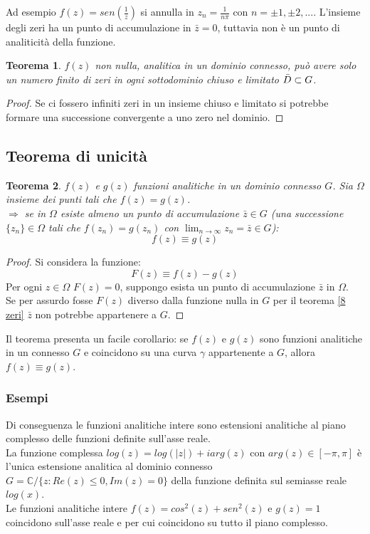 \documentclass[twoside]{article}
\newtheorem{theorem}{Teorema}[section]
\begin{document}
Ad esempio $f(z)=sen\left(\frac{1}{z}\right)$ si annulla in $z_n=\frac{1}{n\pi}$ con $n=\pm 1,\pm 2,...$. L'insieme degli zeri ha un punto di accumulazione in $\bar{z}=0$, tuttavia non è un punto di analiticità della funzione.
\begin{theorem}
$f(z)$ non nulla, analitica in un dominio connesso, può avere solo un numero finito di zeri in ogni sottodominio chiuso e limitato $\Bar{D}\subset G$.
\end{theorem}
\begin{proof}
Se ci fossero infiniti zeri in un insieme chiuso e limitato si potrebbe formare una successione convergente a uno zero nel dominio.
\end{proof}
\subsection{Teorema di unicità}
\begin{theorem}
$f(z)$ e $g(z)$ funzioni analitiche in un dominio connesso $G$. Sia $\Omega$ insieme dei punti tali che $f(z)=g(z)$.\\
$\Longrightarrow$ se in $\Omega$ esiste almeno un punto di accumulazione $\bar{z}\in G$ (una successione $\{z_n\}\in\Omega$ tali che $f(z_n)=g(z_n)$ con $\lim_{n\to\infty}z_n=\bar{z}\in G$):
\begin{equation}
    f(z)\equiv g(z)
\end{equation}
\end{theorem}
\begin{proof}
Si considera la funzione:
\begin{equation}
    F(z)\equiv f(z)-g(z)
\end{equation}
Per ogni $z\in\Omega$ $F(z)=0$, suppongo esista un punto di accumulazione $\bar{z}$ in $\Omega$.\\
Se per assurdo fosse $F(z)$ diverso dalla funzione nulla in $G$ per il teorema \ref{8 zeri} $\bar{z}$ non potrebbe appartenere a $G$.
\end{proof}
Il teorema presenta un facile corollario: se $f(z)$ e $g(z)$ sono funzioni analitiche in un connesso $G$ e coincidono su una curva $\gamma$ appartenente a $G$, allora $f(z)\equiv g(z)$.
\subsubsection{Esempi}
Di conseguenza le funzioni analitiche intere sono estensioni analitiche al piano complesso delle funzioni definite sull'asse reale.\\
La funzione complessa $log(z)=log(|z|)+iarg(z)$ con $arg(z)\in[-\pi,\pi]$ è l'unica estensione analitica al dominio connesso $G=\mathds{C}/\{z:Re(z)\le 0,Im(z)=0\}$ della funzione definita sul semiasse reale $log(x)$.\\
Le funzioni analitiche intere $f(z)=cos^2(z)+sen^2(z)$ e $g(z)=1$ coincidono sull'asse reale e per cui coincidono su tutto il piano complesso.\\
\end{document}
